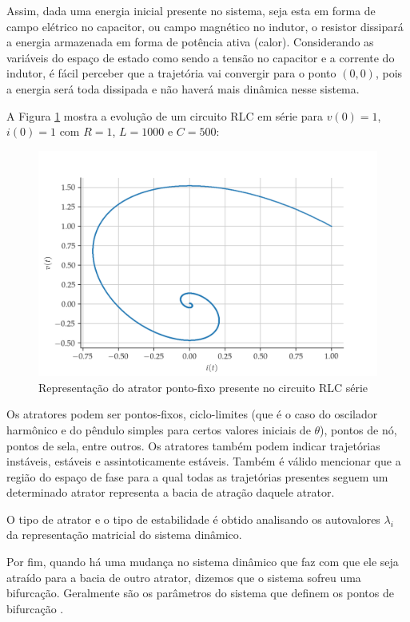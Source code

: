 \documentclass[a4paper, 12pt]{article}
\begin{document}
Assim, dada uma energia inicial presente no sistema, seja esta em forma de campo elétrico no capacitor, ou campo magnético no indutor, o resistor dissipará a energia armazenada em forma de potência ativa (calor). Considerando as variáveis do espaço de estado como sendo a tensão no capacitor e a corrente do indutor, é fácil perceber que a trajetória vai convergir para o ponto $(0, 0)$, pois a energia será toda dissipada e não haverá mais dinâmica nesse sistema.

A Figura \ref{fig:rlc-phase-space} mostra a evolução de um circuito RLC em série para $v(0) = 1$, $i(0) = 1$ com $R = 1$, $L = 1000$ e $C = 500$:
\begin{figure}[!ht]
\centering
\includegraphics[scale = 0.7]{rlc-phase-space.png}
\caption{Representação do atrator ponto-fixo presente no circuito RLC série}
\label{fig:rlc-phase-space}
\end{figure}

Os atratores podem ser pontos-fixos, ciclo-limites (que é o caso do oscilador harmônico e do pêndulo simples para certos valores iniciais de $\theta$), pontos de nó, pontos de sela, entre outros. Os atratores também podem indicar trajetórias instáveis, estáveis e assintoticamente estáveis. Também é válido mencionar que a região do espaço de fase para a qual todas as trajetórias presentes seguem um determinado  atrator representa a bacia de atração daquele atrator. 

O tipo de atrator e o tipo de estabilidade é obtido analisando os autovalores $\lambda_i$ da representação matricial do sistema dinâmico.

Por fim, quando há uma mudança no sistema dinâmico que faz com que ele seja atraído para a bacia de outro atrator, dizemos que o sistema sofreu uma bifurcação. Geralmente são os parâmetros do sistema que definem os pontos de bifurcação \cite{fiedler1994caos}.
\end{document}
